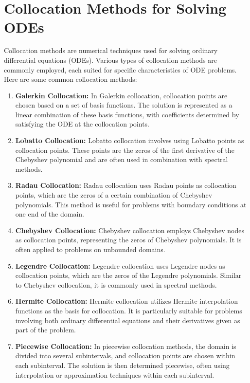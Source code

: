 \documentclass{article}
\begin{document}
\section{Collocation Methods for Solving ODEs}

Collocation methods are numerical techniques used for solving ordinary differential equations (ODEs). Various types of collocation methods are commonly employed, each suited for specific characteristics of ODE problems. Here are some common collocation methods:

\begin{enumerate}
    \item \textbf{Galerkin Collocation:} In Galerkin collocation, collocation points are chosen based on a set of basis functions. The solution is represented as a linear combination of these basis functions, with coefficients determined by satisfying the ODE at the collocation points.

    \item \textbf{Lobatto Collocation:} Lobatto collocation involves using Lobatto points as collocation points. These points are the zeros of the first derivative of the Chebyshev polynomial and are often used in combination with spectral methods.

    \item \textbf{Radau Collocation:} Radau collocation uses Radau points as collocation points, which are the zeros of a certain combination of Chebyshev polynomials. This method is useful for problems with boundary conditions at one end of the domain.

    \item \textbf{Chebyshev Collocation:} Chebyshev collocation employs Chebyshev nodes as collocation points, representing the zeros of Chebyshev polynomials. It is often applied to problems on unbounded domains.

    \item \textbf{Legendre Collocation:} Legendre collocation uses Legendre nodes as collocation points, which are the zeros of the Legendre polynomials. Similar to Chebyshev collocation, it is commonly used in spectral methods.

    \item \textbf{Hermite Collocation:} Hermite collocation utilizes Hermite interpolation functions as the basis for collocation. It is particularly suitable for problems involving both ordinary differential equations and their derivatives given as part of the problem.

    \item \textbf{Piecewise Collocation:} In piecewise collocation methods, the domain is divided into several subintervals, and collocation points are chosen within each subinterval. The solution is then determined piecewise, often using interpolation or approximation techniques within each subinterval.
\end{enumerate}
\end{document}
